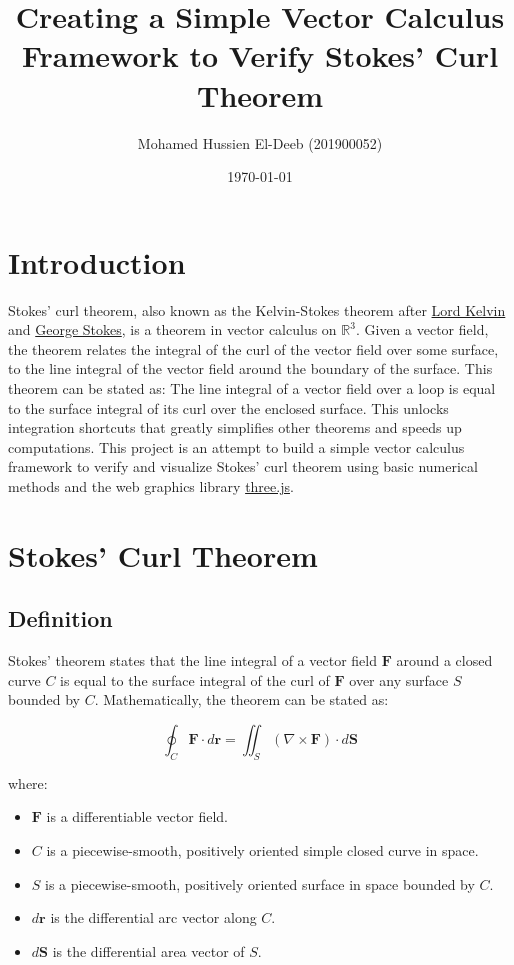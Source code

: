 \documentclass[12pt]{article}
\title{Creating a Simple Vector Calculus Framework to Verify Stokes' Curl Theorem}
\author{Mohamed Hussien El-Deeb (201900052)}
\date{\today}
\begin{document}
\maketitle
\tableofcontents
\hypersetup{linkcolor=RoyalBlue4}

\newpage
\section{Introduction}

Stokes' curl theorem, also known as the Kelvin-Stokes theorem after \href{https://en.wikipedia.org/wiki/Lord_Kelvin}{Lord Kelvin} and
\href{https://en.wikipedia.org/wiki/Sir_George_Stokes,_1st_Baronet}{George Stokes}, is a theorem in vector calculus on \({\displaystyle \mathbb {R} ^{3}}\). Given
a vector field, the theorem relates the integral of the curl of the vector field over some
surface, to the line integral of the vector field around the boundary of the surface. This theorem can be
stated as: The line integral of a vector field over a loop is equal to the surface
integral of its curl over the enclosed surface. This unlocks integration shortcuts that greatly simplifies other theorems and speeds up computations.
This project is an attempt to build a simple vector calculus framework to verify and visualize
Stokes' curl theorem using basic numerical methods and the web graphics library \href{https://threejs.org/}{three.js}.

\newpage
\section{Stokes' Curl Theorem}
\subsection{Definition}

Stokes' theorem states that the line integral of a vector field \(\mathbf{F}\) around a closed curve \(C\) is equal to the surface integral of the curl of \(\mathbf{F}\) over any surface \(S\) bounded by \(C\). Mathematically, the theorem can be stated as:

\[
    \oint_{C} \mathbf{F} \cdot d\mathbf{r} = \iint_{S} (\nabla \times \mathbf{F}) \cdot d\mathbf{S}
\]

where:

\begin{itemize}
    \item \(\mathbf{F}\) is a differentiable vector field.
    \item \(C\) is a piecewise-smooth, positively oriented simple closed curve in space.
    \item \(S\) is a piecewise-smooth, positively oriented surface in space bounded by \(C\).
    \item \(d\mathbf{r}\) is the differential arc vector along \(C\).
    \item \(d\mathbf{S}\) is the differential area vector of \(S\).
\end{itemize}
\end{document}

